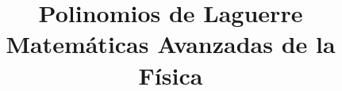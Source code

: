 
\usepackage{mathrsfs}
\usepackage{bigints}
\usepackage{standalone}
\newcommand{\saltosin}{\nonumber \\}
\newcommand{\dprima}[1]{#1^{\prime \prime}}
\newcommand{\prima}[1]{#1^{\prime}}
\newtheorem{teorema}{{\it Teorema}}[section]
\title{Polinomios de Laguerre \\ {\large Matemáticas Avanzadas de la Física}}
\date{ }

\maketitle
\fontsize{14}{14}\selectfont
% 
